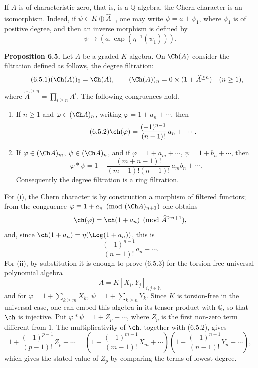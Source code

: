If \(A\) is of characteristic zero, that is, is a \(\mathbb Q\)-algebra, the Chern character is an isomorphism. Indeed, if \(\psi\in K\oplus\widehat A^+\), one may write \(\psi=a+\psi_1\), where \(\psi_1\) is of positive degree, and then an inverse morphism is defined by
\[
  \psi\longmapsto (a,\exp(\eta^{-1}(\psi_1))).
\]

\textbf{Proposition 6.5.} Let \(A\) be a graded \(K\)-algebra. On \(\Ch(A)\) consider the filtration defined as follows, the degree filtration:
\begin{equation}\tag{6.5.1}
  (\Ch(A))_0=\Ch(A),\qquad
  (\Ch(A))_n=0\times(1+\widehat A^{\ge n})\quad(n\ge1),
\end{equation}
where \(\widehat A^{\ge n}=\prod_{i\ge n}A^i\). The following congruences hold.

\begin{enumerate}[label=\roman*)]
\item If \(n\ge1\) and \(\varphi\in(\Ch A)_n\), writing \(\varphi=1+a_n+\cdots\), then
\begin{equation}\tag{6.5.2}
  \ch(\varphi)=\frac{(-1)^{n-1}}{(n-1)!}\,a_n+\cdots .
\end{equation}

\item If \(\varphi\in(\Ch A)_m\), \(\psi\in(\Ch A)_n\), and if
\(\varphi=1+a_m+\cdots\), \(\psi=1+b_n+\cdots\), then
\begin{equation}\tag{6.5.3}
  \varphi*\psi
  =
  1-\frac{(m+n-1)!}{(m-1)!(n-1)!}\,a_m b_n+\cdots .
\end{equation}
Consequently the degree filtration is a ring filtration.
\end{enumerate}

For (i), the Chern character is by construction a morphism of filtered functors; from the congruence \(\varphi\equiv1+a_n\pmod{(\Ch A)_{n+1}}\) one obtains
\[
  \ch(\varphi)=\ch(1+a_n)\pmod{\widehat A^{\ge n+1}},
\]
and, since \(\ch(1+a_n)=\eta(\Log(1+a_n))\), this is
\[
  \frac{(-1)^{n-1}}{(n-1)!}a_n+\cdots .
\]
For (ii), by substitution it is enough to prove (6.5.3) for the torsion-free universal polynomial algebra
\[
 A=K[X_i,Y_j]_{i,j\in\mathbb N}
\]
and for \(\varphi=1+\sum_{k\ge m}X_k\), \(\psi=1+\sum_{k\ge n}Y_k\). Since \(K\) is torsion-free in the universal case, one can embed this algebra in its tensor product with \(\mathbb Q\), so that \(\ch\) is injective. Put \(\varphi*\psi=1+Z_p+\cdots\), where \(Z_p\) is the first non-zero term different from \(1\). The multiplicativity of \(\ch\), together with (6.5.2), gives
\[
  1+\frac{(-1)^{p-1}}{(p-1)!}Z_p+\cdots
  =
  \left(1+\frac{(-1)^{m-1}}{(m-1)!}X_m+\cdots\right)
  \left(1+\frac{(-1)^{n-1}}{(n-1)!}Y_n+\cdots\right),
\]
which gives the stated value of \(Z_p\) by comparing the terms of lowest degree.

